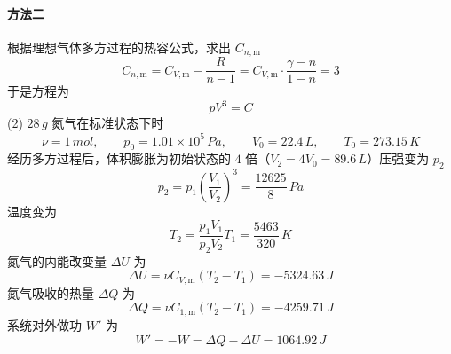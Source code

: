 \begin{solution}
    \paragraph{方法二}
    根据理想气体多方过程的热容公式，求出 $C_{n,\mathrm{m}}$
    $$
        C_{n,\mathrm{m}}
        = C_{V,\mathrm{m}} - \frac{R}{n-1}
        = C_{V,\mathrm{m}} \cdot \frac{\gamma-n}{1-n}
        = 3
    $$
    于是方程为
    $$
        pV^3 = C
    $$
    (2) $28 \,\si{g}$ 氮气在标准状态下时
    $$
        \nu = 1 \,\si{mol},
        \quad\quad
        p_0 = 1.01 \times 10^5 \,\si{Pa},
        \quad\quad
        V_0 = 22.4 \,\si{L},
        \quad\quad
        T_0 = 273.15\,\si{K}
    $$
    经历多方过程后，体积膨胀为初始状态的 $4$ 倍（$V_2 = 4V_0 = 89.6 \,\si{L}$）压强变为 $p_2$
    $$
        p_2 = p_1 \left(\dfrac{V_1}{V_2}\right)^3
        = \frac{12625}{8} \,\si{Pa}
    $$
    温度变为
    $$
        T_2 = \dfrac{p_1V_1}{p_2V_2}T_1 = \frac{5463}{320} \,\si{K}
    $$
    氮气的内能改变量 $\Delta U$ 为
    $$
        \Delta U
        = \nu C_{V,\mathrm{m}} (T_2-T_1)
        = - 5324.63 \,\si{J}
    $$
    氮气吸收的热量 $\Delta Q$ 为
    $$
        \Delta Q
        = \nu  C_{1,\mathrm{m}} (T_2 - T_1)
        = -4259.71 \,\si{J}
    $$
    系统对外做功 $W'$ 为
    $$
        W' = -W = \Delta Q - \Delta U =  1064.92 \,\si{J}
    $$
\end{solution}


